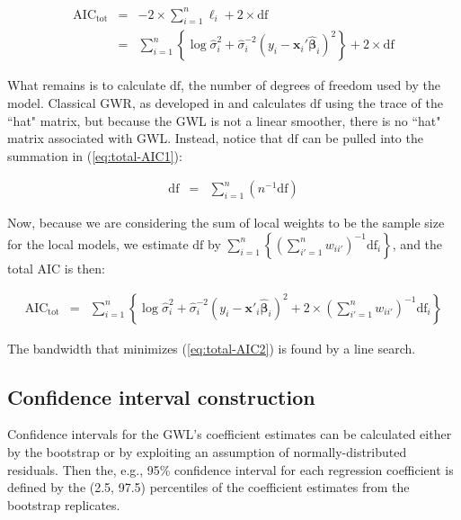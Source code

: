 \documentclass[authoryear, review, 11pt]{elsarticle}
\begin{document}
	\begin{eqnarray}
		\mbox{AIC}_{\mbox{tot}} &=& -2 \times \sum_{i=1}^n \ell_i + 2 \times \mbox{df}\\
		&=& \sum_{i=1}^n \left\{ \log \hat{\sigma}_i^2 + \hat{\sigma}_i^{-2} \left(y_i - \bm{x}_i' \hat{\bm{\beta}}_i \right)^2 \right\} + 2 \times \mbox{df}\label{eq:total-AIC1}
	\end{eqnarray}	
	
	What remains is to calculate $\mbox{df}$, the number of degrees of freedom used by the model. Classical GWR, as developed in \cite{Loader:1999} and \cite{Fotheringham:2002} calculates $\mbox{df}$ using the trace of the ``hat" matrix, but because the GWL is not a linear smoother, there is no ``hat" matrix associated with GWL. Instead, notice that $\mbox{df}$ can be pulled into the summation in (\ref{eq:total-AIC1}):
		
			
	\begin{eqnarray}
		\mbox{df} &=& \sum_{i=1}^n \left( n^{-1} \mbox{df} \right)
	\end{eqnarray}
	
	Now, because we are considering the sum of local weights to be the sample size for the local models, we estimate $\mbox{df}$ by $\sum_{i=1}^n \left\{ \left(\sum_{i'=1}^n w_{ii'} \right)^{-1} \mbox{df}_i \right\}$, and the total AIC is then:
	
	\begin{eqnarray}\label{eq:total-AIC2}
		\mbox{AIC}_{\mbox{tot}} &=& \sum_{i=1}^n \left\{ \log \hat{\sigma}_i^2 + \hat{\sigma}_i^{-2} \left(y_i - \bm{x}'_i \hat{\bm{\beta}}_i \right)^2 + 2 \times \left(\sum_{i'=1}^n w_{ii'} \right)^{-1} \mbox{df}_i \right\}
	\end{eqnarray}
			
	The bandwidth that minimizes (\ref{eq:total-AIC2}) is found by a line search.\\
	
	\subsection{Confidence interval construction}	
	Confidence intervals for the GWL's coefficient estimates can be calculated either by the bootstrap \citep{Efron:1986} or by exploiting an assumption of normally-distributed residuals. Then the, e.g., 95\% confidence interval for each regression coefficient is defined by the (2.5, 97.5) percentiles of the coefficient estimates from the bootstrap replicates.\\
	 
\end{document}
